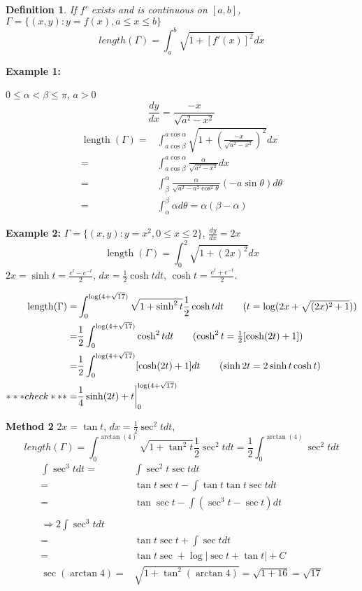 \documentclass[12pt]{article}
\theoremstyle{plain}
\newtheorem{definition}{Definition}[subsection]
\newcommand{\abs}[1]{\left| #1 \right|}
\DeclareMathOperator{\Length}{length}
\begin{document}
\begin{definition}
	If $f'$ exists and is continuous on $[a,b]$, $\Gamma = \{(x,y):
	y= f(x), a\leq x \leq b\}$
	\[
		length(\Gamma) = \int_a^b \sqrt{1+[f'(x)]^2}dx
	\]
\end{definition}

{\color{Brown}
	\textbf{Example 1:}
	
	$0\leq \alpha<\beta\leq \pi$, $a > 0$ 
	\[
		\frac{dy}{dx} = \frac{-x}{\sqrt{a^2-x^2}}
	\]
	\begin{align*}
		\Length(\Gamma) 
		=&\int_{a\cos \beta}^{a\cos \alpha} 
		\sqrt{1+(\frac{-x}{\sqrt{a^2-x^2}})^2}dx\\
		=& \int_{a\cos \beta}^{a\cos \alpha} 
		\frac{\alpha}{\sqrt{a^2-x^2}} dx\\
		=& \int_{\beta}^{\alpha} 
		\frac{\alpha}{\sqrt{a^2-a^2\cos^2\theta}}(-a\sin\theta)d\theta\\
		=&\int_{\alpha}^{\beta} \alpha d\theta
		= \alpha(\beta - \alpha)
	\end{align*}
	
	\textbf{Example 2: }
	$\Gamma = \{(x,y):y = x^2, 0\leq x\leq 2\}$, $\frac{dy}{dx} = 2x$
	\[
		\Length(\Gamma)= \int_0^2 \sqrt{1+(2x)^2}dx
	\]
	$2x = \sinh t = \frac{e^t-e^{-t}}2$, $dx = \frac12\cosh t dt$,
	$\cosh t = \frac{e^t+e^{-t}}2$. 
	
	\begin{align*}
		\Length(\Gamma) 
		=& \int_0^{\log(4+\sqrt{17})} \sqrt{1+\sinh^2 t} \frac 12
		\cosh t dt 
		\tag{$t = \log(2x+\sqrt{(2x)^2+1})$}\\
		=& \frac 12 \int_0^{\log(4+\sqrt{17})} \cosh^2 t dt
		\tag{$\cosh^2 t = \frac 12 [\cosh (2t) + 1]$}\\
		=& \frac12 \int_0^{\log(4+\sqrt{17})} [\cosh(2t) + 1]dt
		\tag{$\sinh 2t= 2 \sinh t \cosh t$}\\
		***check***=& \frac 14 \sinh(2t) + 
		t\bigg\vert_0^{\log(4+\sqrt{17})}
	\end{align*}

	\textbf{Method 2}
	$2x = \tan t$, $dx = \frac 12 \sec^2 t dt$, 
	\[
		length(\Gamma) = \int_0^{\arctan(4)} \sqrt{1+\tan^2 t}
		\frac 12 \sec^2 t dt = \frac 12 \int_0^{\arctan (4)}\sec^2 t dt
	\]
	\begin{align*}
		\int \sec^3 t dt 
		=& \int \sec^2 t \sec t dt\\
		=& \tan t \sec t - \int \tan t \tan t\sec t dt\\
		=& \tan \sec t - \int (\sec^3 t - \sec t)dt\\\\
		\Rightarrow 2 \int \sec^3 t dt \\
		=& \tan t \sec t + \int \sec tdt \\
		=& \tan t \sec + \log\abs{\sec t + \tan t} + C\\
		\sec(\arctan 4) =& \sqrt{1+\tan^2(\arctan 4)} = \sqrt{1+16} = \sqrt{17}
	\end{align*}
}
\end{document}
